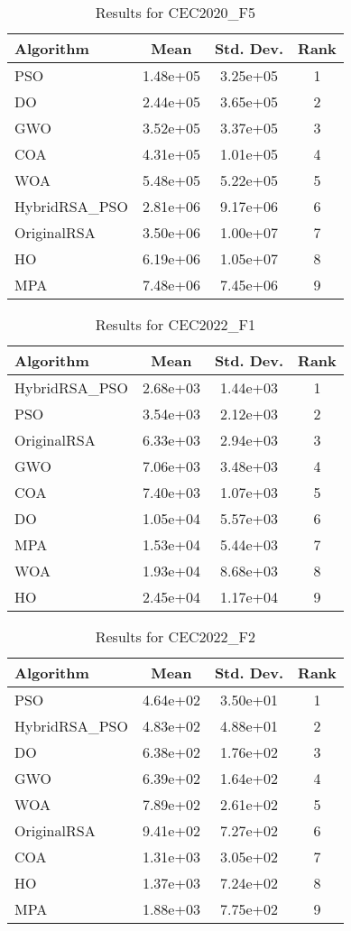 \documentclass[12pt]{article}
\begin{document}
\begin{table}[H]
\centering
\caption{Results for CEC2020\_F5}
\begin{tabular}{|l|c|c|c|}
\hline
\textbf{Algorithm} & \textbf{Mean} & \textbf{Std. Dev.} & \textbf{Rank} \\
\hline
PSO & 1.48e+05 & 3.25e+05 & 1 \\
DO & 2.44e+05 & 3.65e+05 & 2 \\
GWO & 3.52e+05 & 3.37e+05 & 3 \\
COA & 4.31e+05 & 1.01e+05 & 4 \\
WOA & 5.48e+05 & 5.22e+05 & 5 \\
HybridRSA\_PSO & 2.81e+06 & 9.17e+06 & 6 \\
OriginalRSA & 3.50e+06 & 1.00e+07 & 7 \\
HO & 6.19e+06 & 1.05e+07 & 8 \\
MPA & 7.48e+06 & 7.45e+06 & 9 \\
\hline
\end{tabular}
\end{table}

\begin{table}[H]
\centering
\caption{Results for CEC2022\_F1}
\begin{tabular}{|l|c|c|c|}
\hline
\textbf{Algorithm} & \textbf{Mean} & \textbf{Std. Dev.} & \textbf{Rank} \\
\hline
HybridRSA\_PSO & 2.68e+03 & 1.44e+03 & 1 \\
PSO & 3.54e+03 & 2.12e+03 & 2 \\
OriginalRSA & 6.33e+03 & 2.94e+03 & 3 \\
GWO & 7.06e+03 & 3.48e+03 & 4 \\
COA & 7.40e+03 & 1.07e+03 & 5 \\
DO & 1.05e+04 & 5.57e+03 & 6 \\
MPA & 1.53e+04 & 5.44e+03 & 7 \\
WOA & 1.93e+04 & 8.68e+03 & 8 \\
HO & 2.45e+04 & 1.17e+04 & 9 \\
\hline
\end{tabular}
\end{table}

\begin{table}[H]
\centering
\caption{Results for CEC2022\_F2}
\begin{tabular}{|l|c|c|c|}
\hline
\textbf{Algorithm} & \textbf{Mean} & \textbf{Std. Dev.} & \textbf{Rank} \\
\hline
PSO & 4.64e+02 & 3.50e+01 & 1 \\
HybridRSA\_PSO & 4.83e+02 & 4.88e+01 & 2 \\
DO & 6.38e+02 & 1.76e+02 & 3 \\
GWO & 6.39e+02 & 1.64e+02 & 4 \\
WOA & 7.89e+02 & 2.61e+02 & 5 \\
OriginalRSA & 9.41e+02 & 7.27e+02 & 6 \\
COA & 1.31e+03 & 3.05e+02 & 7 \\
HO & 1.37e+03 & 7.24e+02 & 8 \\
MPA & 1.88e+03 & 7.75e+02 & 9 \\
\hline
\end{tabular}
\end{table}
\end{document}
